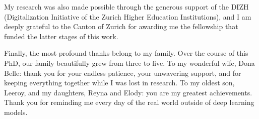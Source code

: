 My research was also made possible through the generous support of the DIZH (Digitalization Initiative of the Zurich Higher Education Institutions), and I am deeply grateful to the Canton of Zurich for awarding me the fellowship that funded the latter stages of this work.

Finally, the most profound thanks belong to my family. Over the course of this PhD, our family beautifully grew from three to five. To my wonderful wife, Dona Belle: thank you for your endless patience, your unwavering support, and for keeping everything together while I was lost in research. To my oldest son, Leeroy, and my daughters, Reyna and Elody: you are my greatest achievements. Thank you for reminding me every day of the real world outside of deep learning models. 
